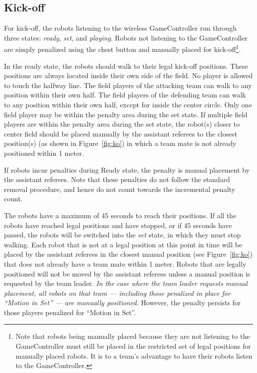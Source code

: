 \documentclass[12pt]{article}
\newcommand{\KickOffAutoTime}{45 seconds\xspace}
\begin{document}
\subsection{Kick-off}
\label{sec:kick-off}
For kick-off, the robots listening to the wireless GameController run through three states: \emph{ready}, \emph{set}, and \emph{playing}. Robots not listening to the GameController are simply penalized using the chest button and manually placed for kick-off\footnote{Note that robots being manually placed because they are not listening to the GameController must still be placed in the restricted set of legal positions for manually placed robots. It is to a team's advantage to have their robots listen to the GameController.}.  

In the ready state, the robots should walk to their legal kick-off positions. These positions are always located inside their own side of the field. No player is allowed to touch the halfway line.
The field players of the attacking team can walk to any position within their own half.
The field players of the defending team can walk to any position within their own half, except for inside the center circle.  Only one field player may be within the penalty area during the set state.  If multiple field players are within the penalty area during the set state, the robot(s) closer to center field should be placed manually by the assistant referees to the closest position(s) (as shown in Figure~\ref{fig:ko}) in which a team mate is not already positioned within 1 meter.

If robots incur penalties during Ready state, the penalty is manual placement by the assistant referees. Note that these penalties do not follow the standard removal procedure, and hence do not count towards the incremental penalty count.

The robots have a maximum of \KickOffAutoTime to reach their positions. If all the robots have reached legal positions and have stopped, or if \KickOffAutoTime have passed, the robots will be switched into the \emph{set} state, in which they must stop walking. Each robot that is not at a legal position at this point in time will be placed by the assistant referees in the closest manual position (see Figure~\ref{fig:ko}) that does not already have a team mate within 1 meter.
Robots that are legally positioned will not be moved by the assistant referees unless a manual position is requested by the team leader.
\emph{In the case where the team leader requests manual placement, all robots on that team --- including those penalized in place for ``Motion in Set'' --- are manually positioned.}  However, the penalty persists for those players penalized for ``Motion in Set''.
\end{document}
